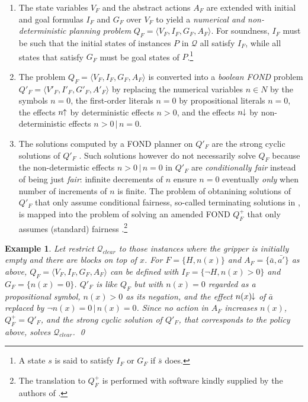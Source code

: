 \documentclass[letterpaper]{article} %
\newcommand{\tup}[1]{\langle #1 \rangle}
\newtheorem{example}[definition]{Example}
\newcommand{\Q}{\mathcal{Q}}
\newcommand{\pplus}{\hspace{-.05em}\raisebox{.15ex}{\footnotesize$\uparrow$}}
\newcommand{\mminus}{\hspace{-.05em}\raisebox{.15ex}{\footnotesize$\downarrow$}}
\begin{document}
\begin{enumerate}[1.]
  \item The state variables $V_F$ and the abstract actions $A_F$ are
    extended with initial and goal formulas $I_F$ and $G_F$ over $V_F$
    to yield a \emph{numerical and non-deterministic planning problem}
    $Q_F=\tup{V_F,I_F,G_F,A_F}$. For soundness, $I_F$ must be such that
    the initial states of instances $P$ in $\Q$ all satisfy $I_F$, while
    all states that satisfy $G_F$ must be goal states of $P$.\footnote{A
    state $s$ is said to satisfy $I_F$ or $G_F$ if  $\bar{s}$ does.}
%
  \item The problem $Q_F=\tup{V_F,I_F,G_F,A_F}$ is converted into a
    \emph{boolean FOND} problem $Q'_F=\tup{V'_F,I'_F,G'_F,A'_F}$ by
    replacing the numerical variables $n\in N$ by the symbols $n=0$,
    the first-order literals $n=0$ by propositional literals  $n=0$, 
    the effects $n\pplus$ by deterministic effects $n > 0$, and the
    effects $n\mminus$ by non-deterministic effects $n>0\,|\,n=0$.
%
  \item The solutions computed by a FOND planner on $Q'_F$ are the
    strong cyclic solutions of $Q'_F$ \cite{strong-cyclic}.
    Such solutions however do not necessarily solve $Q_F$ because the
    non-determistic effects $n>0\,|\,n=0$ in $Q'_F$ are \emph{conditionally fair}
    instead of being just \emph{fair}: infinite decrements of $n$ ensure
    $n=0$ eventually \emph{only} when number of increments of $n$ is finite.
    The problem of obtanining solutions of $Q'_F$ that only assume conditional
    fairness, so-called terminating solutions in \cite{srivastava:aaai2011},
    is mapped into the problem of solving an amended FOND $Q^+_F$ that
    only assumes (standard) fairness \cite{bonet:ijcai2017}.\footnote{The
    translation to $Q^+_F$ is performed with software kindly supplied by the authors of \cite{bonet:ijcai2017}.}
\end{enumerate}


\begin{example}
  Let restrict  $\Q_{clear}$  to those  instances where  the gripper is initially empty
  and there are blocks on top of $x$. For $F=\{H,n(x)\}$  and $A_F=\{\bar{a},\bar{a'}\}$ as above, 
  $Q_F=\tup{V_F,I_F,G_F,A_F}$ can be defined with $I_F=\{\neg H, n(x) > 0\}$ and $G_F=\{n(x)=0\}$.
  $Q'_F$ is like $Q_F$ but with $n(x)=0$ regarded as a propositional symbol, $n(x) > 0$
  as its negation, and the effect $n(x)\mminus$ of  $\bar{a}$ replaced by  $\neg n(x)=0 \, | \, n(x)=0$.
  Since  no action in $A_F$  increases $n(x)$,   $Q^+_F=Q'_F$, and the strong cyclic solution  of $Q'_F$,
  that corresponds to the policy above, solves $\Q_{clear}$. \qed
\end{example}
\end{document}
